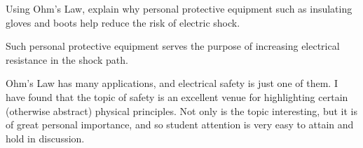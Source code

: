 

Using Ohm's Law, explain why personal protective equipment such as insulating gloves and boots help reduce the risk of electric shock.







Such personal protective equipment serves the purpose of increasing electrical resistance in the shock path.







Ohm's Law has many applications, and electrical safety is just one of them.  I have found that the topic of safety is an excellent venue for highlighting certain (otherwise abstract) physical principles.  Not only is the topic interesting, but it is of great personal importance, and so student attention is very easy to attain and hold in discussion.




